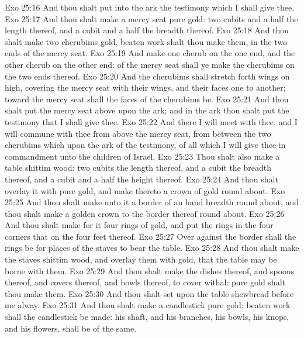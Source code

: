 \vs Exo 25:16 And thou shalt put into the ark the testimony which I shall give thee.
\vs Exo 25:17 And thou shalt make a mercy seat  pure gold: two cubits and a half  the length thereof, and a cubit and a half the breadth thereof.
\vs Exo 25:18 And thou shalt make two cherubims  gold,  beaten work shalt thou make them, in the two ends of the mercy seat.
\vs Exo 25:19 And make one cherub on the one end, and the other cherub on the other end:  of the mercy seat shall ye make the cherubims on the two ends thereof.
\vs Exo 25:20 And the cherubims shall stretch forth  wings on high, covering the mercy seat with their wings, and their faces  one to another; toward the mercy seat shall the faces of the cherubims be.
\vs Exo 25:21 And thou shalt put the mercy seat above upon the ark; and in the ark thou shalt put the testimony that I shall give thee.
\vs Exo 25:22 And there I will meet with thee, and I will commune with thee from above the mercy seat, from between the two cherubims which  upon the ark of the testimony, of all  which I will give thee in commandment unto the children of Israel.
\vs Exo 25:23 Thou shalt also make a table  shittim wood: two cubits  the length thereof, and a cubit the breadth thereof, and a cubit and a half the height thereof.
\vs Exo 25:24 And thou shalt overlay it with pure gold, and make thereto a crown of gold round about.
\vs Exo 25:25 And thou shalt make unto it a border of an hand breadth round about, and thou shalt make a golden crown to the border thereof round about.
\vs Exo 25:26 And thou shalt make for it four rings of gold, and put the rings in the four corners that  on the four feet thereof.
\vs Exo 25:27 Over against the border shall the rings be for places of the staves to bear the table.
\vs Exo 25:28 And thou shalt make the staves  shittim wood, and overlay them with gold, that the table may be borne with them.
\vs Exo 25:29 And thou shalt make the dishes thereof, and spoons thereof, and covers thereof, and bowls thereof, to cover withal:  pure gold shalt thou make them.
\vs Exo 25:30 And thou shalt set upon the table shewbread before me alway.
\vs Exo 25:31 And thou shalt make a candlestick  pure gold:  beaten work shall the candlestick be made: his shaft, and his branches, his bowls, his knops, and his flowers, shall be of the same.
